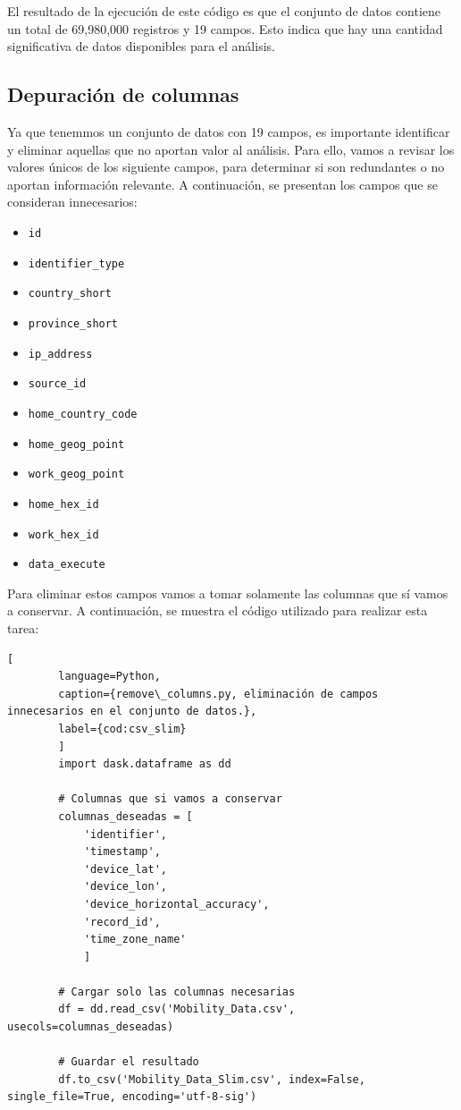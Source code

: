 \noindent El resultado de la ejecución de este código es que el conjunto de datos contiene un total de 69,980,000 registros y 19 campos. Esto indica que hay una cantidad significativa de datos disponibles para el análisis.

\subsection{Depuración de columnas}
\label{subsec:depuracion_columnas}
\noindent Ya que tenemmos un conjunto de datos con 19 campos, es importante identificar y eliminar aquellas que no aportan valor al análisis. Para ello, vamos a revisar los valores únicos de los siguiente campos, para determinar si son redundantes o no aportan información relevante. A continuación, se presentan los campos que se consideran innecesarios:
\begin{itemize}
    \item \texttt{id}
    \item \texttt{identifier\_type}
    \item \texttt{country\_short}
    \item \texttt{province\_short}
    \item \texttt{ip\_address}
    \item \texttt{source\_id}
    \item \texttt{home\_country\_code}
    \item \texttt{home\_geog\_point}
    \item \texttt{work\_geog\_point}
    \item \texttt{home\_hex\_id}
    \item \texttt{work\_hex\_id}
    \item \texttt{data\_execute}
\end{itemize}

\noindent Para eliminar estos campos vamos a tomar solamente las columnas que sí vamos a conservar. A continuación, se muestra el código utilizado para realizar esta tarea:

    \begin{lstlisting}[
        language=Python,
        caption={remove\_columns.py, eliminación de campos innecesarios en el conjunto de datos.},
        label={cod:csv_slim}
        ]
        import dask.dataframe as dd

        # Columnas que si vamos a conservar
        columnas_deseadas = [
            'identifier',
            'timestamp',
            'device_lat',
            'device_lon',
            'device_horizontal_accuracy',
            'record_id',
            'time_zone_name'
            ]

        # Cargar solo las columnas necesarias
        df = dd.read_csv('Mobility_Data.csv', usecols=columnas_deseadas)

        # Guardar el resultado
        df.to_csv('Mobility_Data_Slim.csv', index=False, single_file=True, encoding='utf-8-sig')
    \end{lstlisting}

